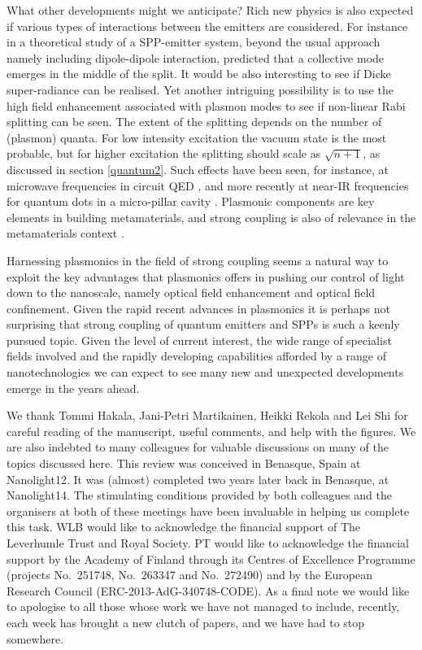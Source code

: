 \documentclass[12pt]{iopart}
\begin{document}
What other developments might we anticipate? Rich new physics is also expected if various types of interactions between the emitters are considered. For instance in \cite{Salomon2012} a theoretical study of a SPP-emitter system, beyond the usual approach namely including dipole-dipole interaction, predicted that a collective mode emerges in the middle of the split. It would be also interesting to see if Dicke super-radiance can be realised. Yet another intriguing possibility is to use the high field enhancement associated with plasmon modes to see if non-linear Rabi splitting can be seen. The extent of the splitting depends on the number of (plasmon) quanta. For low intensity excitation the vacuum state is the most probable, but for higher excitation the splitting should scale as $\sqrt{n+1}$, as discussed in section \ref{quantum2}. Such effects have been seen, for instance, at microwave frequencies in circuit QED \cite{Fink_Nature_2008_454_315,Bishop_NatPhys_2009_5_105}, and more recently at near-IR frequencies for quantum dots in a micro-pillar cavity \cite{Kasprzak_NJP_2013_15_045013}. Plasmonic components are key elements in building metamaterials, and strong coupling is also of relevance in the metamaterials  context \cite{Benz_NatCom_2013_4_2882}.

Harnessing plasmonics in the field of strong coupling seems a natural way to exploit the key advantages that plasmonics offers in pushing our control of light down to the nanoscale, namely optical field enhancement and optical field confinement. Given the rapid recent advances in plasmonics it is perhaps not surprising that strong coupling of quantum emitters and SPPs is such a keenly pursued topic. Given the level of current interest, the wide range of specialist fields involved and the rapidly developing capabilities afforded by a range of nanotechnologies we can expect to see many new and unexpected developments emerge in the years ahead.

\ack
We thank Tommi Hakala, Jani-Petri Martikainen, Heikki Rekola and Lei Shi for careful reading of the manuscript, useful comments, and help with the figures. We are also indebted to many colleagues for valuable discussions on many of the topics discussed here. This review was conceived in Benasque, Spain at Nanolight12. It was (almost) completed two years later back in Benasque, at Nanolight14. The stimulating conditions provided by both colleagues and the organisers at both of these meetings have been invaluable in helping us complete this task. WLB would like to acknowledge the financial support of The Leverhumle Trust and Royal Society. PT would like to acknowledge the financial support by the Academy of Finland through its Centres of Excellence Programme (projects No.\ 251748, No.\ 263347 and No.\ 272490) and by the European Research Council (ERC-2013-AdG-340748-CODE). As a final note we would like to apologise to all those whose work we have not managed to include, recently, each week has brought a new clutch of papers, and we have had to stop somewhere.
\end{document}
